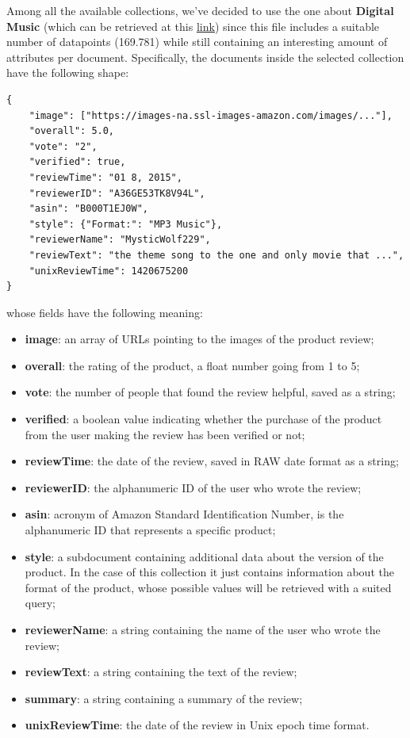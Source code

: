 Among all the available collections, we've decided to use the one about \textbf{Digital Music} (which can be retrieved at this \href{https://jmcauley.ucsd.edu/data/amazon_v2/categoryFilesSmall/Digital_Music_5.json.gz}{\color{blue}\underline{link}}) since this file includes a suitable number of datapoints (169.781) while still containing an interesting amount of attributes per document.
Specifically, the documents inside the selected collection have the following shape:
\begin{verbatim}
{
    "image": ["https://images-na.ssl-images-amazon.com/images/..."], 
    "overall": 5.0, 
    "vote": "2",
    "verified": true, 
    "reviewTime": "01 8, 2015", 
    "reviewerID": "A36GE53TK8V94L", 
    "asin": "B000T1EJ0W", 
    "style": {"Format:": "MP3 Music"}, 
    "reviewerName": "MysticWolf229", 
    "reviewText": "the theme song to the one and only movie that ...", 
    "unixReviewTime": 1420675200
}
\end{verbatim}
whose fields have the following meaning:
\begin{itemize}
    \item \textbf{image}: an array of URLs pointing to the images of the product review;
    \item \textbf{overall}: the rating of the product, a float number going from 1 to 5;
    \item \textbf{vote}: the number of people that found the review helpful, saved as a string;
    \item \textbf{verified}: a boolean value indicating whether the purchase of the product from the user making the review has been verified or not;
    \item \textbf{reviewTime}: the date of the review, saved in RAW date format as a string;
    \item \textbf{reviewerID}: the alphanumeric ID of the user who wrote the review;
    \item \textbf{asin}: acronym of Amazon Standard Identification Number, is the alphanumeric ID that represents a specific product;
    \item \textbf{style}: a subdocument containing additional data about the version of the product. In the case of this collection it just contains information about the format of the product, whose possible values will be retrieved with a suited query;
    \item \textbf{reviewerName}: a string containing the name of the user who wrote the review;
    \item \textbf{reviewText}: a string containing the text of the review;
    \item \textbf{summary}: a string containing a summary of the review;
    \item \textbf{unixReviewTime}: the date of the review in Unix epoch time format.
\end{itemize}